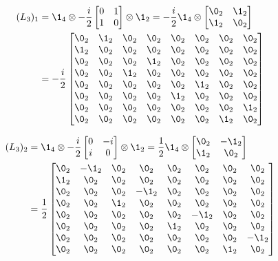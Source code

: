 \begin{align*}
    (L_3)_1&=\1_4\otimes-\frac{i}{2}\begin{bmatrix}
        0&1\\
        1&0
    \end{bmatrix}\otimes\1_2=-\frac{i}{2}\1_4\otimes\begin{bmatrix}
        \0_2&\1_2\\
        \1_2&\0_2
    \end{bmatrix}\\
    &=-\frac{i}{2}\begin{bmatrix}
        \0_2&\1_2&\0_2&\0_2&\0_2&\0_2&\0_2&\0_2\\
        \1_2&\0_2&\0_2&\0_2&\0_2&\0_2&\0_2&\0_2\\
        \0_2&\0_2&\0_2&\1_2&\0_2&\0_2&\0_2&\0_2\\
        \0_2&\0_2&\1_2&\0_2&\0_2&\0_2&\0_2&\0_2\\
        \0_2&\0_2&\0_2&\0_2&\0_2&\1_2&\0_2&\0_2\\
        \0_2&\0_2&\0_2&\0_2&\1_2&\0_2&\0_2&\0_2\\
        \0_2&\0_2&\0_2&\0_2&\0_2&\0_2&\0_2&\1_2\\
        \0_2&\0_2&\0_2&\0_2&\0_2&\0_2&\1_2&\0_2\\
    \end{bmatrix}
\end{align*}

\begin{align*}
    (L_3)_2&=\1_4\otimes-\frac{i}{2}\begin{bmatrix}
        0&-i\\
        i&0
    \end{bmatrix}\otimes\1_2=\frac{1}{2}\1_4\otimes\begin{bmatrix}
        \0_2&-\1_2\\
        \1_2&\0_2
    \end{bmatrix}\\
    &=\frac{1}{2}\begin{bmatrix}
        \0_2&-\1_2&\0_2&\0_2&\0_2&\0_2&\0_2&\0_2\\
        \1_2&\0_2&\0_2&\0_2&\0_2&\0_2&\0_2&\0_2\\
        \0_2&\0_2&\0_2&-\1_2&\0_2&\0_2&\0_2&\0_2\\
        \0_2&\0_2&\1_2&\0_2&\0_2&\0_2&\0_2&\0_2\\
        \0_2&\0_2&\0_2&\0_2&\0_2&-\1_2&\0_2&\0_2\\
        \0_2&\0_2&\0_2&\0_2&\1_2&\0_2&\0_2&\0_2\\
        \0_2&\0_2&\0_2&\0_2&\0_2&\0_2&\0_2&-\1_2\\
        \0_2&\0_2&\0_2&\0_2&\0_2&\0_2&\1_2&\0_2\\
    \end{bmatrix}
\end{align*}


